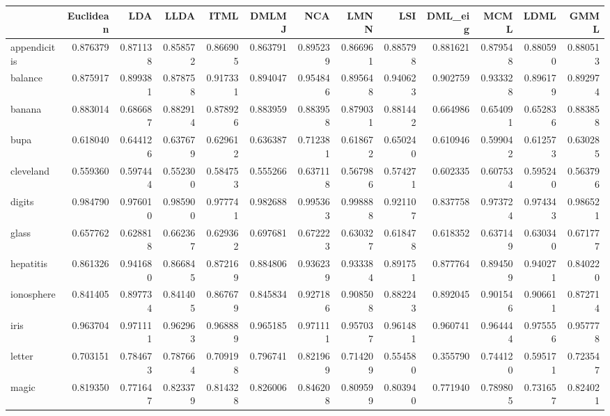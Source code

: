 \begin{tabular}{lrrrrrrrrrrrr}
\toprule
{} &  Euclidean &       LDA &      LLDA &      ITML &     DMLMJ &       NCA &      LMNN &       LSI &   DML\_eig &      MCML &      LDML &      GMML \\
\midrule
appendicitis    &   0.876379 &  0.871138 &  0.858572 &  0.866905 &  0.863791 &  0.895239 &  0.866961 &  0.885798 &  0.881621 &  0.879548 &  0.880590 &  0.880513 \\
balance         &   0.875917 &  0.899381 &  0.878758 &  0.917331 &  0.894047 &  0.954846 &  0.895648 &  0.940623 &  0.902759 &  0.933328 &  0.896179 &  0.892974 \\
banana          &   0.883014 &  0.686687 &  0.882914 &  0.878926 &  0.883959 &  0.883958 &  0.879031 &  0.881442 &  0.664986 &  0.654091 &  0.652836 &  0.883858 \\
bupa            &   0.618040 &  0.644126 &  0.637679 &  0.629612 &  0.636387 &  0.712381 &  0.618672 &  0.650240 &  0.610946 &  0.599042 &  0.612573 &  0.630285 \\
cleveland       &   0.559360 &  0.597444 &  0.552300 &  0.584753 &  0.555266 &  0.637118 &  0.567986 &  0.574271 &  0.602335 &  0.607534 &  0.595240 &  0.563796 \\
digits          &   0.984790 &  0.976010 &  0.985900 &  0.977741 &  0.982688 &  0.995363 &  0.998888 &  0.921107 &  0.837758 &  0.973724 &  0.974343 &  0.986521 \\
glass           &   0.657762 &  0.628818 &  0.662367 &  0.629362 &  0.697681 &  0.672223 &  0.630327 &  0.618478 &  0.618352 &  0.637149 &  0.630340 &  0.671777 \\
hepatitis       &   0.861326 &  0.941680 &  0.866845 &  0.872169 &  0.884806 &  0.936239 &  0.933384 &  0.891751 &  0.877764 &  0.894509 &  0.940271 &  0.840220 \\
ionosphere      &   0.841405 &  0.897734 &  0.841405 &  0.867679 &  0.845834 &  0.927186 &  0.908508 &  0.882243 &  0.892045 &  0.901546 &  0.906611 &  0.872714 \\
iris            &   0.963704 &  0.971111 &  0.962963 &  0.968889 &  0.965185 &  0.971111 &  0.957037 &  0.961481 &  0.960741 &  0.964444 &  0.975556 &  0.957778 \\
letter          &   0.703151 &  0.784673 &  0.787664 &  0.709198 &  0.796741 &  0.821969 &  0.714209 &  0.554580 &  0.355790 &  0.744120 &  0.595171 &  0.723547 \\
magic           &   0.819350 &  0.771647 &  0.823379 &  0.814328 &  0.826006 &  0.846208 &  0.809599 &  0.803940 &  0.771940 &  0.789805 &  0.731657 &  0.824021 \\

\end{tabular}
